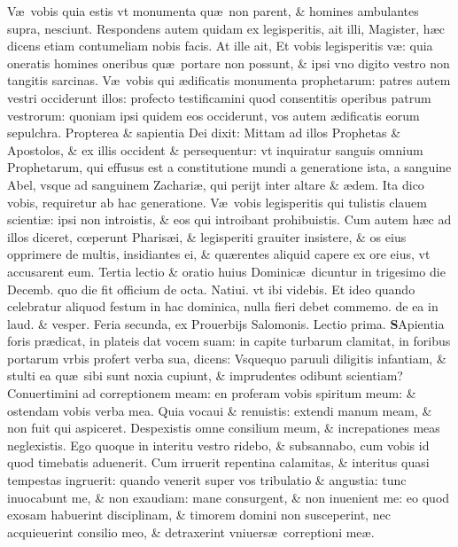 \documentclass[a5paper,10pt]{book}
\def\rightmarginnote{%
	\lrmarginnote{\hskip\columnwidth \hskip -1em}}
\def\ae{æ}
\def\oe{œ}
\begin{document}
\begin{multicols*}{2}
V\ae \ vobis quia estis vt monumenta qu\ae \ non parent, \& homines ambulantes supra, nesciunt.
Respondens autem quidam ex legisperitis, ait illi, Magister, h\ae c dicens etiam contumeliam nobis facis.
At ille ait, Et vobis legisperitis v\ae : quia oneratis homines oneribus qu\ae \ portare non possunt, \& ipsi vno digito vestro non tangitis sarcinas.
V\ae \ vobis qui \ae dificatis monumenta prophetarum: patres autem vestri occiderunt illos: profecto testificamini quod consentitis operibus patrum vestrorum: quoniam ipsi quidem eos occiderunt, vos autem \ae dificatis eorum sepulchra.
Propterea \& sapientia Dei dixit: Mittam ad illos Prophetas \& Apostolos, \& ex illis occident \& persequentur: vt inquiratur sanguis omnium Prophetarum, qui effusus est a constitutione mundi a generatione ista, a sanguine Abel, vsque ad sanguinem Zachari\ae , qui perijt inter altare \& \ae dem.
Ita dico vobis, requiretur
ab hac generatione.
V\ae \ vobis legisperitis qui tulistis clauem scienti\ae : ipsi non introistis, \& eos qui introibant prohibuistis.
Cum autem h\ae c ad illos diceret, c\oe perunt Pharis\ae i, \& legisperiti grauiter insistere, \& os eius opprimere de multis, insidiantes ei, \& qu\ae rentes aliquid capere ex ore eius, vt accusarent eum.
\newline {} \color{red} Tertia lectio \& oratio huius Dominic\ae \ dicuntur in trigesimo die Decemb. quo die fit officium de octa. Natiui. vt ibi videbis. Et ideo quando celebratur aliquod festum in hac dominica, nulla fieri debet commemo. de ea in laud. \& vesper. \color{black}
\newline {} \color{red} \hypertarget{MON-PRIMA-POST-ADV}{Feria secunda,} ex Prouerbijs Salomonis. \hfill Lectio prima. \color{black}
\vspace{-1.25em}
\lettrine[lines=2]{\bfseries S}{}Apientia\rightmarginnote{ca. 1.} foris pr\ae dicat, in plateis dat vocem suam: in capite turbarum clamitat, in foribus portarum vrbis profert verba sua, dicens: Vsquequo paruuli diligitis infantiam, \& stulti ea qu\ae \ sibi sunt noxia cupiunt, \& imprudentes odibunt scientiam?
Conuertimini ad correptionem meam: en proferam vobis spiritum meum: \& ostendam vobis verba mea.
Quia vocaui \& renuistis: extendi manum meam, \& non fuit qui aspiceret.
Despexistis omne consilium meum, \& increpationes meas neglexistis.
Ego quoque in interitu vestro ridebo, \& subsannabo, cum vobis id quod timebatis aduenerit.
Cum irruerit repentina calamitas, \& interitus quasi tempestas ingruerit: quando venerit super vos tribulatio \& angustia: tunc inuocabunt me, \& non exaudiam: mane consurgent, \& non inuenient me: eo quod exosam habuerint disciplinam, \& timorem domini non susceperint, nec acquieuerint consilio meo, \& detraxerint vniuers\ae \ correptioni me\ae .

\end{multicols*}
\end{document}
